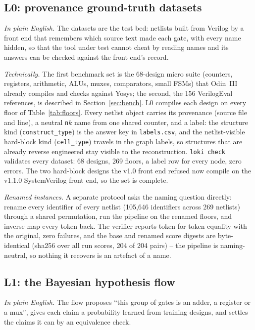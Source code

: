 \documentclass[conference]{IEEEtran}
\newcommand{\code}[1]{\texttt{#1}}
\begin{document}
\subsection{L0: provenance ground-truth datasets}
\label{sec:l0}

\emph{In plain English.} The datasets are the test bed: netlists built from Verilog by a front end
that remembers which source text made each gate, with every name hidden, so that the tool under
test cannot cheat by reading names and its answers can be checked against the front end's record.

\emph{Technically.} The first benchmark set is the 68-design micro suite (counters, registers, arithmetic, ALUs,
muxes, comparators, small FSMs) that Odin~III already compiles and checks against Yosys; the
second, the 156 VerilogEval references, is described in Section~\ref{sec:bench}. L0 compiles
each design on every floor of Table~\ref{tab:floors}. Every netlist object carries its
provenance (source file and line), a
neutral \code{n}$k$ name from one shared counter, and a label: the structure kind
(\code{construct\_type}) is the answer key in \code{labels.csv}, and the netlist-visible
hard-block kind (\code{cell\_type}) travels in the graph labels, so structures that are
already reverse engineered stay visible to the reconstruction. \code{loki check} validates
every dataset: 68 designs, 269 floors, a label row for every node, zero errors. The two hard-block
designs the v1.0 front end refused now compile on the v1.1.0 SystemVerilog front end, so the
set is complete.

\emph{Renamed instances.} A separate protocol asks the naming question directly: rename every
identifier of every netlist (105,646 identifiers across 269 netlists) through a shared
permutation, run the pipeline on the renamed floors, and inverse-map every token back. The
verifier reports token-for-token equality with the original, zero failures, and the base and
renamed score digests are byte-identical (sha256 over all run scores, 204 of 204 pairs) --
the pipeline is naming-neutral, so nothing it recovers is an artefact of a name.

\subsection{L1: the Bayesian hypothesis flow}
\label{sec:l1}

\emph{In plain English.} The flow proposes ``this group of gates is an adder, a register or a mux'', gives each claim a
probability learned from training designs, and settles the claims it can by an equivalence check.
\end{document}
